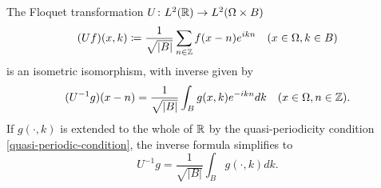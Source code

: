 \begin{theorem} \label{3.2:thm-UIsometricIsomorphism}
	The Floquet transformation $U \colon L^{2}(\mathbb{R}) \rightarrow L^{2}(\Omega \times B)$ 
	\begin{equation}
		(Uf)(x, k) \coloneqq \frac{1}{\sqrt{|B|}} \sum_{n \in \mathbb{Z}} f(x - n) e^{ikn} \quad (x \in \Omega, k \in B) \label{floquet-transformation}
	\end{equation}
	is an isometric isomorphism, with inverse given by
		\begin{equation}
			(U^{-1}g)(x - n) = \frac{1}{\sqrt{|B|}} \int_{B} g(x, k) e^{-ikn} dk \quad (x \in \Omega, n \in \mathbb{Z}). \label{3.8}
		\end{equation} 
	If $g(\cdot, k)$ is extended to the whole of $\mathbb{R}$ by the quasi-periodicity condition \eqref{quasi-periodic-condition}, the inverse formula simplifies to
		\begin{equation}
			U^{-1} g = \frac{1}{\sqrt{|B|}} \int_{B} g(\cdot, k) dk. \label{3.9}
		\end{equation}
		

\end{theorem}
